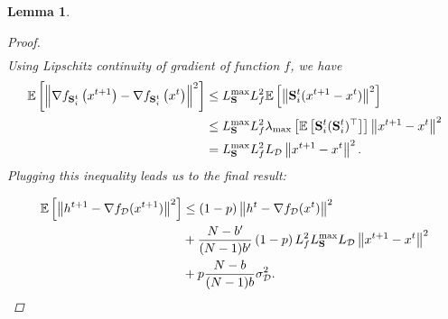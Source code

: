 \documentclass{article}
\newtheorem{lemma}{Lemma}
\theoremstyle{plain}
\newcommand{\tf}{f_{\mathcal{D}}}
\newcommand{\mS}{{\bf S}}
\theoremstyle{plain}
\theoremstyle{definition}
\theoremstyle{remark}
\begin{document}
\begin{lemma}
\begin{proof}
\begin{align*}
   \end{align*}
Using Lipschitz continuity of gradient of function $f$, we have
\begin{align*}
    \mathbb{E}\left[\left\|\nabla f_{\mS^t_i}\left(x^{t+1}\right)-\nabla f_{\mS^t_i}\left(x^t\right)\right\|^2 \right] & \leq  L^{\max}_{\mS} L_f^2 \mathbb{E} \left[ \left\| \mS^t_i (x^{t+1} - x^t) \right\|^2 \right]\\
    &\leq L^{\max}_{\mS} L_f^2 \lambda_{\max}\left[ \mathbb{E}\left[\mS^t_i (\mS^t_i)^{\top} \right] \right]\left\| x^{t+1} - x^t\right\|^2\\
    &=L^{\max}_{\mS} L_f^2 L_{\mathcal{D}} \left\| x^{t+1} - x^t\right\|^2.
\end{align*}
Plugging this inequality leads us to the final result:

  \begin{align*}
\mathbb{E}\left[\left\|h^{t+1}-\nabla \tf(x^{t+1})\right\|^2\right] &\leq\left(1-p\right)\left\|h^t-\nabla \tf(x^t)\right\|^2\\
&+\frac{N-b^{\prime}}{(N-1)b^{\prime}}\left(1-p\right) L_f^2 L^{\max}_{\mS} L_{\mathcal{D}}\left\|x^{t+1}-x^t\right\|^2\\
&+ p\frac{N-b}{(N-1)b} \sigma^2_{\mathcal{D}}.
  \end{align*}

\end{proof}



\end{lemma}
\end{document}
